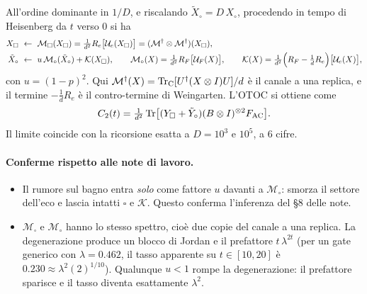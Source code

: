 All'ordine dominante in $1/D$, e riscalando $\tilde X_\circ=D\,X_\circ$, procedendo in tempo di Heisenberg da $t$ verso $0$ si ha
\begin{align*}
X_\square&\ \leftarrow\ \mathcal M_\square(X_\square)=\tfrac1{d^2}R_e\bigl[\mathcal U_e(X_\square)\bigr]=(\mathcal M^\dagger\otimes\mathcal M^\dagger)(X_\square),\\
\tilde X_\circ&\ \leftarrow\ u\,\mathcal M_\circ(\tilde X_\circ)+\mathcal K(X_\square),\qquad \mathcal M_\circ(X)=\tfrac1{d^2}R_F\bigl[\mathcal U_F(X)\bigr],\qquad \mathcal K(X)=\tfrac1{d^2}\Bigl(R_F-\tfrac1dR_e\Bigr)\bigl[\mathcal U_e(X)\bigr],
\end{align*}
con $u=(1-p)^2$. Qui $\mathcal M^\dagger(X)=\operatorname{Tr}_{\rm C}[U^\dagger(X\otimes I)U]/d$ è il canale a una replica, e il termine $-\tfrac1d R_e$ è il contro-termine di Weingarten. L'OTOC si ottiene come
\[
C_2(t)=\tfrac1{d^2}\operatorname{Tr}\bigl[(Y_\square+\tilde Y_\circ)(B\otimes I)^{\otimes2}F_{\rm AC}\bigr].
\]
Il limite coincide con la ricorsione esatta a $D=10^3$ e $10^5$, a 6 cifre.

\paragraph{Conferme rispetto alle note di lavoro.}
\begin{itemize}[leftmargin=1.5em]
\item Il rumore sul bagno entra \emph{solo} come fattore $u$ davanti a $\mathcal M_\circ$: smorza il settore dell'eco e lascia intatti $\square$ e $\mathcal K$. Questo conferma l'inferenza del \S8 delle note.
\item $\mathcal M_\square$ e $\mathcal M_\circ$ hanno lo stesso spettro, cioè due copie del canale a una replica. La degenerazione produce un blocco di Jordan e il prefattore $t\,\lambda^{2t}$ (per un gate generico con $\lambda=0.462$, il tasso apparente su $t\in[10,20]$ è $0.230\approx\lambda^2(2)^{1/10}$). Qualunque $u<1$ rompe la degenerazione: il prefattore sparisce e il tasso diventa esattamente $\lambda^2$.
\end{itemize}

